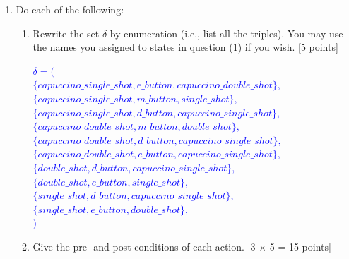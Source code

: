 \documentclass[12pt,fleqn]{article}
\begin{document}
\begin{enumerate}
\clearpage

\item Do each of the following:
\begin{enumerate}
\item Rewrite the set $\delta$ by enumeration (i.e., list all the triples). You may use the names you assigned to states in question (1) if you wish.  [5 points]

  \textcolor{blue}{
    $\delta = ($\\
    $\{capuccino\_single\_shot, e\_button, capuccino\_double\_shot\},$ \\
    $\{capuccino\_single\_shot, m\_button, single\_shot\},$ \\
    $\{capuccino\_single\_shot, d\_button, capuccino\_single\_shot\},$ \\
    $\{capuccino\_double\_shot, m\_button, double\_shot\},$ \\
    $\{capuccino\_double\_shot, d\_button, capuccino\_single\_shot\},$ \\
    $\{capuccino\_double\_shot, e\_button, capuccino\_single\_shot\},$ \\
    $\{double\_shot, d\_button, capuccino\_single\_shot\},$ \\
    $\{double\_shot, e\_button, single\_shot\},$ \\
    $\{single\_shot, d\_button, capuccino\_single\_shot\},$ \\
    $\{single\_shot, e\_button, double\_shot\},$ \\
    $)$ \\
  }


\item Give the pre- and post-conditions of each action. [3 $\times$ 5 = 15 points]
\end{enumerate}


\end{enumerate}
\end{document}

